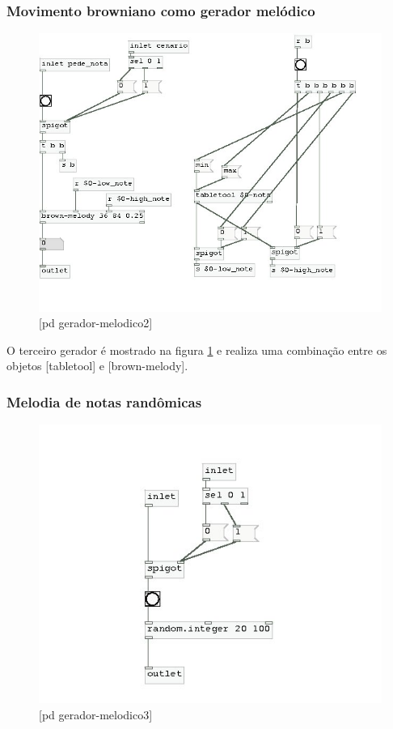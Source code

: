 \documentclass[draft]{ppgmus}
\begin{document}
\subsubsection{Movimento browniano como gerador melódico}


\begin{figure}
\includegraphics[scale=.6]{gera-melodico2}
\caption{[pd gerador-melodico2]}
\label{gera-melodico2}
\end{figure}  


O terceiro gerador é mostrado na figura \ref{gera-melodico2} e
realiza uma combinação entre os objetos [tabletool] e [brown-melody].


\subsubsection{Melodia  de notas randômicas}


\begin{figure}
\includegraphics[scale=.6]{gera-melodico3}
\caption{[pd gerador-melodico3]}
\label{gera-melodico3}
\end{figure}  
\end{document}

